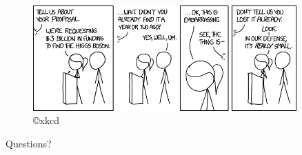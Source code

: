 \documentclass{beamer}
\begin{document}

\appendix

\begin{frame}

\begin{figure}
\includegraphics[width=0.9\textwidth]{./figures/xkcd.png}\\
{\hfill \scriptsize \copyright xkcd}
\end{figure}

\vspace{0.5cm}

\begin{center}
{\Huge  Questions?}
\end{center}
\end{frame}
\end{document}
